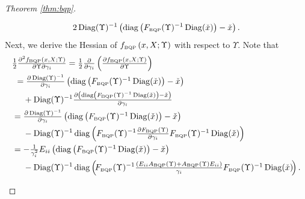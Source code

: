 \documentclass[smallextended]{svjour3hack}       %
\DeclareMathOperator{\Diag}{Diag}
\DeclareMathOperator{\diag}{diag}
\begin{document}
\begin{proof}[Theorem \ref{thm:bqp}]
\begin{itemize}
\begin{align*}
2\Diag(\Upsilon)^{-1}\left(\diag\left(F_{{\tiny\mbox{BQP}}}(\Upsilon)^{-1}\Diag(\check{x})\right)-\check{x}\right).
    \end{align*}
   Next, we derive the Hessian of $f_{{\tiny\mbox{BQP}}}\left(x,X;\Upsilon\right)$ with respect to $\Upsilon$. Note that
    \begin{align*}
    &\textstyle\frac{1}{2}\frac{\partial^2 f_{{\tiny\mbox{BQP}}}\left(x,X;\Upsilon\right)}{\partial \Upsilon \partial \gamma_i}
    = \frac{1}{2}\frac{\partial}{\partial\gamma_i}\left(\frac{\partial f_{{\tiny\mbox{BQP}}}\left(x,X;\Upsilon\right)}{\partial \Upsilon}\right)\\
    &~ = \textstyle \frac{\partial \Diag(\Upsilon)^{-1}}{\partial\gamma_i} \left(\diag\left(F_{{\tiny\mbox{BQP}}}(\Upsilon)^{-1}\Diag(\check{x})\right)-\check{x}\right)
    \\
    &~~~~  +\Diag(\Upsilon)^{-1}  \textstyle\frac{\partial \left(\diag\left(F_{{\tiny\mbox{BQP}}}(\Upsilon)^{-1}\Diag(\check{x})\right)-\check{x} \right)}{\partial\gamma_i} \\
    &=  \textstyle\frac{\partial \Diag(\Upsilon)^{-1}}{\partial\gamma_i} \left(\diag\left(F_{{\tiny\mbox{BQP}}}(\Upsilon)^{-1}\Diag(\check{x})\right)-\check{x}\right)\\
    &~~~~ -\Diag(\Upsilon)^{-1}  \diag\left(F_{{\tiny\mbox{BQP}}}(\Upsilon)^{-1} \textstyle\frac{\partial F_{{\tiny\mbox{BQP}}}(\Upsilon)}{\partial\gamma_i}F_{{\tiny\mbox{BQP}}}(\Upsilon)^{-1}\Diag(\check{x})\right) \\
    &= -\textstyle\frac{1}{\gamma_i^2}E_{ii}\left(\diag\left(F_{{\tiny\mbox{BQP}}}(\Upsilon)^{-1}\Diag(\check{x})\right)-\check{x}\right)\\
    &~~~~  - \Diag(\Upsilon)^{-1}\diag\left(\!F_{{\tiny\mbox{BQP}}}(\Upsilon)^{-1}\textstyle\frac{\left(E_{ii}A_{{\tiny\mbox{BQP}}}(\Upsilon)+A_{{\tiny\mbox{BQP}}}(\Upsilon) E_{ii}\right)}{\gamma_i}
  F_{{\tiny\mbox{BQP}}}(\Upsilon)^{-1}\Diag(\check{x})\!\right).

\end{align*}
\end{itemize}
\end{proof}
\end{document}
